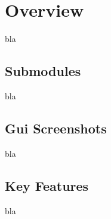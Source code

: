 % 
% 

\section{Overview}

bla

\subsection{Submodules}

bla

\subsection{Gui Screenshots}

bla

\subsection{Key Features}

bla

